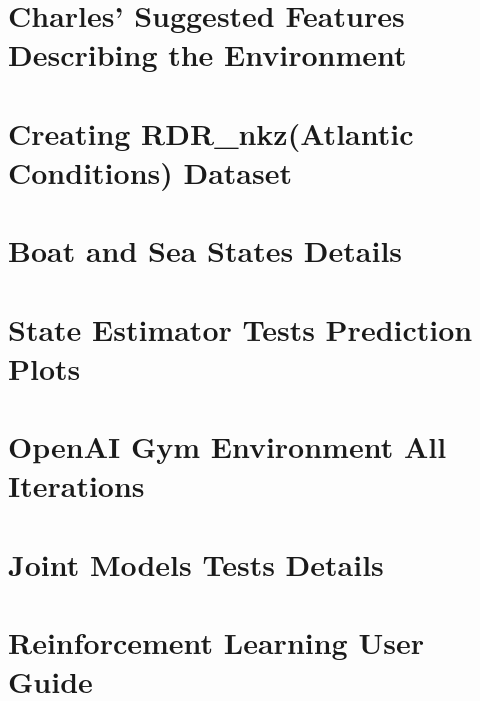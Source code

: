 \documentclass[12pt,twoside]{report}
\begin{document}
\chapter{Charles' Suggested Features Describing the Environment}
\label{app:essential-features}


\chapter{Creating RDR\_nkz(Atlantic Conditions) Dataset}
\label{app:RDR}


\chapter{Boat and Sea States Details}
\label{app:states}


\chapter{State Estimator Tests Prediction Plots}
\label{app:prediction-plots}


\chapter{OpenAI Gym Environment All Iterations}
\label{app:rl-iters}


\chapter{Joint Models Tests Details}
\label{app:joint}


\chapter{Reinforcement Learning User Guide}
\label{app:user-guide}

\end{document}
